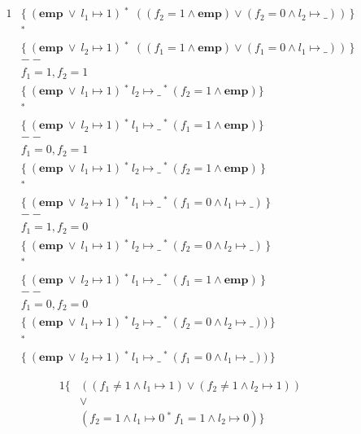 \documentclass[12pt]{article}
\newcommand{\mt}[2]{
  #1 \mapsto #2
}
\newcommand{\sepcon}[2]{
  #1\ ^*\ #2
}
\newcommand{\emp}{
  \textbf{emp}
}
\begin{document}
\begin{alignat*}{1}
  & \{\ (\emp\ \lor\ \mt{l_1}{1})\  ^*\ \ (( f_2 = 1 \land \emp) \lor ( f_2 = 0 \land \mt{l_2}{\_} ))\,\} \\
  & ^*\\
  & \{\ (\emp\ \lor\ \mt{l_2}{1})\  ^*\ \ (( f_1 = 1 \land \emp) \lor ( f_1 = 0 \land \mt{l_1}{\_} ))\,\} \\
  & -- \\
  & f_1 = 1, f_2 = 1 \\
  & \{\ (\emp\ \lor\ \mt{l_1}{1})\ ^*\  \mt{l_2}{\_}\ ^*\ ( f_2 = 1 \land \emp)\} \\
  & ^*\\
  & \{\ (\emp\ \lor\ \mt{l_2}{1})\ ^*\  \mt{l_1}{\_}\ ^*\ ( f_1 = 1 \land \emp)\} \\
  & -- \\
  & f_1 = 0, f_2 = 1 \\
  & \{\ (\emp\ \lor\ \mt{l_1}{1})\  ^*\  \mt{l_2}{\_}\ ^*\ (f_2 = 1 \land \emp)\,\} \\
  & ^*\\
  & \{\ (\emp\ \lor\ \mt{l_2}{1})\  ^*\  \mt{l_1}{\_}\ ^*\ (f_1 = 0 \land \mt{l_1}{\_} )\,\} \\
  & -- \\
  & f_1 = 1, f_2 = 0 \\
  & \{\ (\emp\ \lor\ \mt{l_1}{1})\  ^*\  \mt{l_2}{\_}\ ^*\ ( f_2 = 0 \land \mt{l_2}{\_} )\,\} \\
  & ^*\\
  & \{\ (\emp\ \lor\ \mt{l_2}{1})\  ^*\  \mt{l_1}{\_}\ ^*\ (f_1 = 1 \land \emp)\,\} \\
  & -- \\
  & f_1 = 0, f_2 = 0 \\
  & \{\ (\emp\ \lor\ \mt{l_1}{1})\  ^*\  \mt{l_2}{\_}\ ^*\ (f_2 = 0 \land \mt{l_2}{\_} ))\,\} \\
  & ^*\\
  & \{\ (\emp\ \lor\ \mt{l_2}{1})\  ^*\  \mt{l_1}{\_}\ ^*\ (f_1 = 0 \land \mt{l_1}{\_} ))\,\}
\end{alignat*}

\newpage

\begin{alignat*}{1}
  \{
  & ((f_1 \neq 1 \land \mt{l_1}{1}) \lor (f_2 \neq 1 \land \mt{l_2}{1})) \\
  & \lor \\
  & ( \sepcon{f_2 = 1 \land \mt{l_1}{0}}{f_1 = 1 \land \mt{l_2}{0}})
  \}
\end{alignat*}
\end{document}
